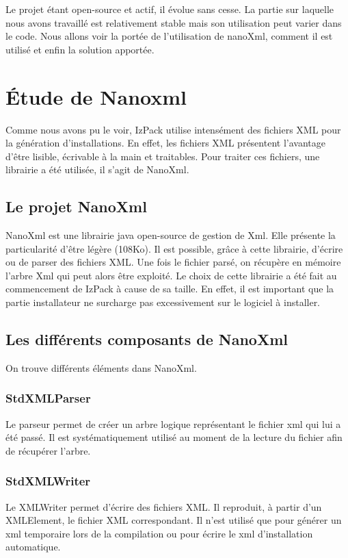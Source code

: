 Le projet étant open-source et actif, il évolue sans cesse. La partie sur laquelle nous avons travaillé est relativement stable mais son utilisation peut varier dans le code. Nous allons voir la portée de l'utilisation de nanoXml, comment il est utilisé et enfin la solution apportée.

\section{Étude de Nanoxml}
Comme nous avons pu le voir, IzPack utilise intensément des fichiers XML pour la génération d'installations.
En effet, les fichiers XML présentent l'avantage d'être lisible, écrivable à la main et traitables.
Pour traiter ces fichiers, une librairie a été utilisée, il s'agit de NanoXml.
\subsection{Le projet NanoXml}
NanoXml est une librairie java open-source de gestion de Xml.
Elle présente la particularité d'être légère (108Ko).
Il est possible, grâce à cette librairie, d'écrire ou de parser des fichiers XML.
Une fois le fichier parsé, on récupère en mémoire l'arbre Xml qui peut alors être exploité.
Le choix de cette librairie a été fait au commencement de IzPack à cause de sa taille.
En effet, il est important que la partie installateur ne surcharge pas excessivement sur le logiciel à installer.

\subsection{Les différents composants de NanoXml}
On trouve différents éléments dans NanoXml.
\subsubsection{StdXMLParser}
Le parseur permet de créer un arbre logique représentant le fichier xml qui lui a été passé.
Il est systématiquement utilisé au moment de la lecture du fichier afin de récupérer l'arbre.
\subsubsection{StdXMLWriter}
Le XMLWriter permet d'écrire des fichiers XML.
Il reproduit, à partir d'un XMLElement, le fichier XML correspondant.
Il n'est utilisé que pour générer un xml temporaire lors de la compilation ou pour écrire le xml d'installation automatique.
